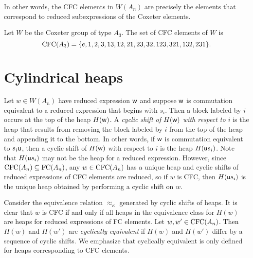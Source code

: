     In other words, the CFC elements in $W(A_n)$ are precisely the elements that correspond to reduced subexpressions of the Coxeter elements.

\begin{example} Let $W$ be the Coxeter group of type $A_3$. The set of CFC elements of $W$ is
	$$\operatorname{\mathrm{CFC}}(A_3) = \{e, 1, 2, 3, 13, 12, 21, 23, 32, 123, 321, 132, 231\}.$$
\end{example}

\section{Cylindrical heaps}
    Let $w \in W(A_n)$ have reduced expression $\mathsf{w}$ and suppose $\mathsf{w}$ is commutation equivalent to a reduced expression that begins with $s_i$. Then a block labeled by $i$ occurs at the top of the heap $H(\mathsf{w})$.
    A \emph{cyclic shift of $H(\mathsf{w})$ with respect to $i$} is the heap that results from removing the block labeled by $i$ from the top of the heap and appending it to the bottom.
    In other words, if $\mathsf{w}$ is commutation equivalent to $s_i\mathsf{u}$, then a cyclic shift of $H(\mathsf{w})$ with respect to $i$ is the heap $H(\mathsf{u} s_i)$.
    Note that $H(\mathsf{u} s_i)$ may not be the heap for a reduced expression. 
    However, since $\operatorname{\mathrm{CFC}}(A_n) \subseteq \operatorname{FC}(A_n)$, any $w \in \operatorname{\mathrm{CFC}}(A_n)$ has a unique heap and cyclic shifts of reduced expressions of CFC elements are reduced, so if $w$ is CFC, then $H(\mathsf{u} s_i)$ is the unique heap obtained by performing a cyclic shift on $w$.
    
    Consider the equivalence relation $\approx_\kappa$ generated by cyclic shifts of heaps.
    It is clear that $w$ is CFC if and only if all heaps in the equivalence class for $H(w)$ are heaps for reduced expressions of FC elements.
    Let $w, w' \in \operatorname{\mathrm{CFC}}(A_n)$. Then $H(w)$ and $H(w')$ are \emph{cyclically equivalent} if $H(w)$ and $H(w')$ differ by a sequence of cyclic shifts.
    We emphasize that cyclically equivalent is only defined for heaps corresponding to CFC elements.

